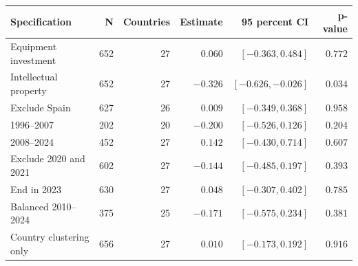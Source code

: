 \begin{tabularx}{\linewidth}{@{}Y r r r r r@{}}
\toprule
\textbf{Specification} & \textbf{N} & \textbf{Countries} & \textbf{Estimate} & \textbf{95 percent CI} & \textbf{p-value}\\
\midrule
Equipment investment & 652 & 27 & $0.060$ & $[-0.363, 0.484]$ & $0.772$\\
Intellectual property & 652 & 27 & $-0.326$ & $[-0.626, -0.026]$ & $0.034$\\
Exclude Spain & 627 & 26 & $0.009$ & $[-0.349, 0.368]$ & $0.958$\\
1996--2007 & 202 & 20 & $-0.200$ & $[-0.526, 0.126]$ & $0.204$\\
2008--2024 & 452 & 27 & $0.142$ & $[-0.430, 0.714]$ & $0.607$\\
Exclude 2020 and 2021 & 602 & 27 & $-0.144$ & $[-0.485, 0.197]$ & $0.393$\\
End in 2023 & 630 & 27 & $0.048$ & $[-0.307, 0.402]$ & $0.785$\\
Balanced 2010--2024 & 375 & 25 & $-0.171$ & $[-0.575, 0.234]$ & $0.381$\\
Country clustering only & 656 & 27 & $0.010$ & $[-0.173, 0.192]$ & $0.916$\\
\bottomrule
\end{tabularx}
